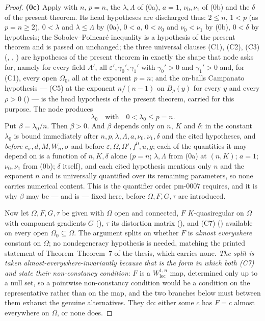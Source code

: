 \begin{proof}
\textbf{(0c)} Apply  with $n$, $p=n$, the
$\lambda,\Lambda$ of (0a), $a=1$, $\nu_0,\nu_1$ of (0b) and the $\delta$ of the
present theorem.  Its head hypotheses are discharged thus: $2\le n$, $1<p$ (as
$p=n\ge2$), $0<\lambda$ and $\lambda\le\Lambda$ by (0a), $0<a$, $0<\nu_0$ and
$\nu_0<\nu_1$ by (0b), $0<\delta$ by hypothesis; the Sobolev--Poincar\'e
inequality  is a hypothesis of the present
theorem and is passed on unchanged; the three universal clauses (C1), (C2), (C3)
(, ,
) are hypotheses of the present theorem in exactly
the shape that node asks for, namely for every field $A'$, all
$\varepsilon',\gamma_0',\gamma_1'$ with $\gamma_0'>0$ and $\gamma_1'>0$ and, for
(C1), every open $\Omega_0$, all at the exponent $p=n$; and the on-balls
Campanato hypothesis --- (C5) at the exponent $n/(n-1)$ on $B_\rho(y)$ for every
$y$ and every $\rho>0$ () --- is the head
hypothesis of the present theorem, carried for this purpose.  The node produces
\[
\lambda_0\quad\text{with}\quad 0<\lambda_0\le p=n .
\]
Put $\beta=\lambda_0/n$.  Then $\beta>0$.  And $\beta$ depends only on $n$, $K$
and $\delta$: in  the constant $\lambda_0$ is
bound immediately after $n,p,\lambda,\Lambda,a,\nu_0,\nu_1,\delta$ and the cited
hypotheses, and \emph{before} $c_\sigma,d,M,W_n,\sigma$ and before
$\varepsilon,\Omega,\Omega',f^0,u,g$; each of the quantities it may depend on is
a function of $n,K,\delta$ alone ($p=n$; $\lambda,\Lambda$ from (0a) at $(n,K)$;
$a=1$; $\nu_0,\nu_1$ from (0b); $\delta$ itself), and each cited hypothesis
mentions only $n$ and the exponent $n$ and is universally quantified over its
remaining parameters, so none carries numerical content.  This is the quantifier
order pm-0007 requires, and it is why $\beta$ may be --- and is --- fixed here,
before $\Omega,F,G,\tau$ are introduced.

Now let $\Omega,F,G,\tau$ be given with $\Omega$ open and connected, $F$
$K$-quasiregular on $\Omega$ with component gradients $G$
(), $\tau$ its distortion matrix
(), and (C7) ()
available on every open $\Omega_0\subseteq\Omega$.  The argument splits on
whether $F$ is \emph{almost everywhere} constant on $\Omega$; no nondegeneracy
hypothesis is needed, matching the printed statement of Theorem~Theorem~7 of the thesis,
which carries none.  \emph{The split is taken almost-everywhere-invariantly
because that is the form in which both \textup{(C7)} and
 state their non-constancy condition}: $F$ is
a $W^{1,n}_{\mathrm{loc}}$ map, determined only up to a null set, so a pointwise
non-constancy condition would be a condition on the representative rather than
on the map, and the two branches below must between them exhaust the genuine
alternatives.  They do: either some $c$ has $F=c$ almost everywhere on $\Omega$,
or none does.


\end{proof}
